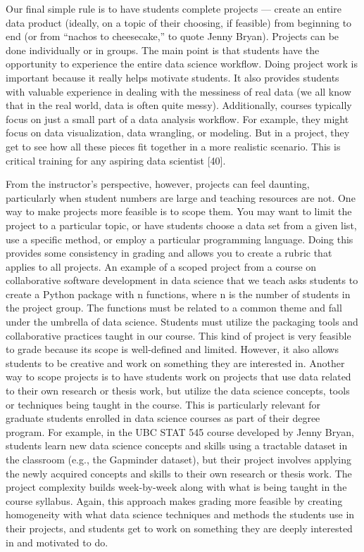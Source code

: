 \documentclass[
  10pt,
  letterpaper,
]{article}
\begin{document}
Our final simple rule is to have students complete projects --- create
an entire data product (ideally, on a topic of their choosing, if
feasible) from beginning to end (or from ``nachos to cheesecake,'' to
quote Jenny Bryan). Projects can be done individually or in groups. The
main point is that students have the opportunity to experience the
entire data science workflow. Doing project work is important because it
really helps motivate students. It also provides students with valuable
experience in dealing with the messiness of real data (we all know that
in the real world, data is often quite messy). Additionally, courses
typically focus on just a small part of a data analysis workflow. For
example, they might focus on data visualization, data wrangling, or
modeling. But in a project, they get to see how all these pieces fit
together in a more realistic scenario. This is critical training for any
aspiring data scientist {[}40{]}.

From the instructor's perspective, however, projects can feel daunting,
particularly when student numbers are large and teaching resources are
not. One way to make projects more feasible is to scope them. You may
want to limit the project to a particular topic, or have students choose
a data set from a given list, use a specific method, or employ a
particular programming language. Doing this provides some consistency in
grading and allows you to create a rubric that applies to all projects.
An example of a scoped project from a course on collaborative software
development in data science that we teach asks students to create a
Python package with n functions, where n is the number of students in
the project group. The functions must be related to a common theme and
fall under the umbrella of data science. Students must utilize the
packaging tools and collaborative practices taught in our course. This
kind of project is very feasible to grade because its scope is
well-defined and limited. However, it also allows students to be
creative and work on something they are interested in. Another way to
scope projects is to have students work on projects that use data
related to their own research or thesis work, but utilize the data
science concepts, tools or techniques being taught in the course. This
is particularly relevant for graduate students enrolled in data science
courses as part of their degree program. For example, in the UBC STAT
545 course developed by Jenny Bryan, students learn new data science
concepts and skills using a tractable dataset in the classroom (e.g.,
the Gapminder dataset), but their project involves applying the newly
acquired concepts and skills to their own research or thesis work. The
project complexity builds week-by-week along with what is being taught
in the course syllabus. Again, this approach makes grading more feasible
by creating homogeneity with what data science techniques and methods
the students use in their projects, and students get to work on
something they are deeply interested in and motivated to do.
\end{document}
